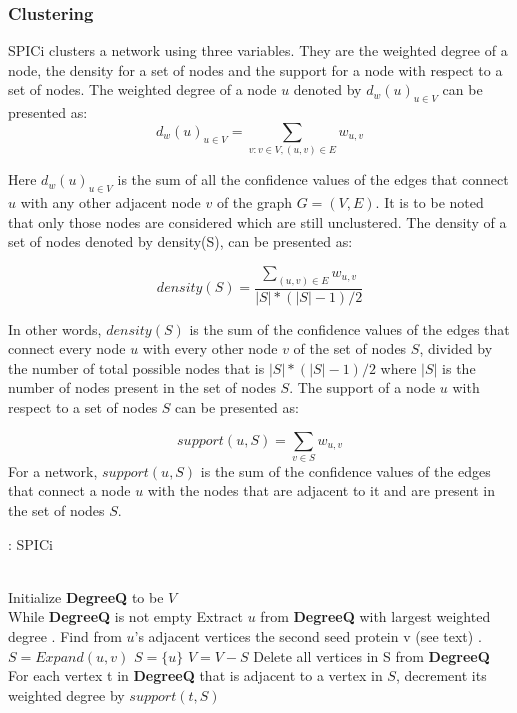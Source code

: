 \documentclass[a4paper,twocolumn,preprint]{elsarticle}
\begin{document}
\subsubsection{Clustering}
SPICi clusters a network using three variables. They are the weighted degree of a node, the density for a set of nodes and the support for a node with respect to a set of nodes. The weighted degree of a node $u$ denoted by $d_w(u)_{u\in V}$ can be presented as:
\begin{equation} \label{eqn:spicidegree}
d_w(u)_{u\in V} = \sum_{v:v\in V,(u,v) \in E}w_{u,v}
\end{equation}

Here $d_w(u)_{u\in V}$ is the sum of all the confidence values of the edges that connect $u$ with any other adjacent node $v$ of the graph $G=(V,E)$. It is to be noted that only those nodes are considered which are still unclustered. The density of a set of nodes denoted by density(S), can be presented as:

\begin{equation} \label{eqn:spicidensity}
density(S) = \frac{\sum_{(u,v)\in E}w_{u,v}}{|S|*(|S|-1)/2} 
\end{equation}

In other words, $density(S)$ is the sum of the confidence values of the edges that connect every node $u$ with every other node $v$ of the set of nodes $S$, divided by the number of total possible nodes that is $|S|*(|S|-1)/2$ where $|S|$ is the number of nodes present in the set of nodes $S$. The support of a node $u$ with respect to a set of nodes $S$ can be presented as:

\begin{equation} \label{support}
support(u,S) = \sum_{v\in S} w_{u,v}
\end{equation}
For a network, $support(u,S)$ is the sum of the confidence values of the edges that connect a node $u$ with the nodes that are adjacent to it and are present in the set of nodes $S$.

\begin{algorithm}
	\caption{: SPICi}\label{spicicode}
	\begin{algorithmic}[1]
		 \\
		Initialize \textbf{DegreeQ} to be $V$ \\
		While \textbf{DegreeQ} is not empty
		\State Extract $u$ from \textbf{DegreeQ} with largest weighted degree
		. Find from $u$’s adjacent vertices the second seed protein v (see text)
		. $S=Expand(u,v)$
		\Else 
		\State $S=\{u\}$
		\EndIf
		\State $V=V-S$
		\State Delete all vertices in S from \textbf{DegreeQ}
		\State For each vertex t in \textbf{DegreeQ} that is adjacent to a vertex in $S$, decrement its weighted degree by $support(t,S)$
		\EndProcedure
	\end{algorithmic}
\end{algorithm}
\end{document}
